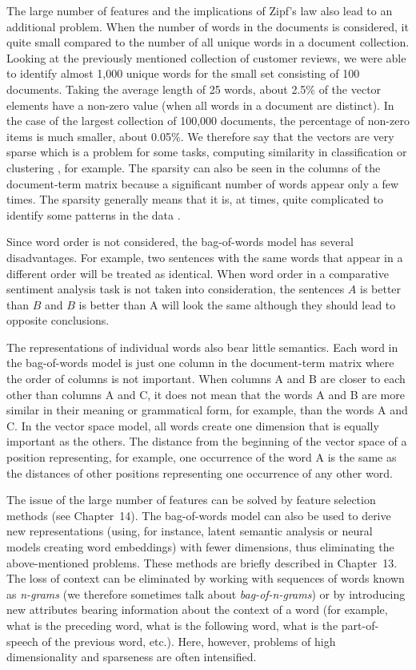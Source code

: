 The large number of features and the implications of Zipf’s law also lead to
an additional problem. When the number of words in the documents is considered, it quite small compared to the number of all unique words in a document
collection. Looking at the previously mentioned collection of customer reviews,
we were able to identify almost 1,000 unique words for the small set consisting
of 100 documents. Taking the average length of 25 words, about 2.5\% of the
vector elements have a non-zero value (when all words in a document are distinct). In the case of the largest collection of 100,000 documents, the percentage
of non-zero items is much smaller, about 0.05\%. We therefore say that the vectors are very sparse which is a problem for some tasks, computing similarity in
classification or clustering \cite{ref177}, for example. The sparsity can also be seen in
the columns of the document-term matrix because a significant number of words
appear only a few times. The sparsity generally means that it is, at times, quite
complicated to identify some patterns in the data \cite{ref87}.

Since word order is not considered, the bag-of-words model has several disadvantages. For example, two sentences with the same words that appear in a
different order will be treated as identical. When word order in a comparative
sentiment analysis task is not taken into consideration, the sentences $A$ is better
than $B$ and $B$ is better than A will look the same although they should lead to
opposite conclusions.

The representations of individual words also bear little semantics. Each word
in the bag-of-words model is just one column in the document-term matrix where
the order of columns is not important. When columns A and B are closer to each other than columns A and C, it does not mean that the words A and B are more
similar in their meaning or grammatical form, for example, than the words A
and C. In the vector space model, all words create one dimension that is equally
important as the others. The distance from the beginning of the vector space of a
position representing, for example, one occurrence of the word A is the same as
the distances of other positions representing one occurrence of any other word.

The issue of the large number of features can be solved by feature selection 
methods (see Chapter~14). The bag-of-words model can also be used
to derive new representations (using, for instance, latent semantic analysis or
neural models creating word embeddings) with fewer dimensions, thus eliminating
the above-mentioned problems. These methods are briefly described in
Chapter~13. The loss of context can be eliminated by working with sequences of
words known as \textit{n-grams} (we therefore sometimes talk about \textit{bag-of-n-grams}) or
by introducing new attributes bearing information about the context of a word
(for example, what is the preceding word, what is the following word, what is
the part-of-speech of the previous word, etc.). Here, however, problems of high
dimensionality and sparseness are often intensified.

